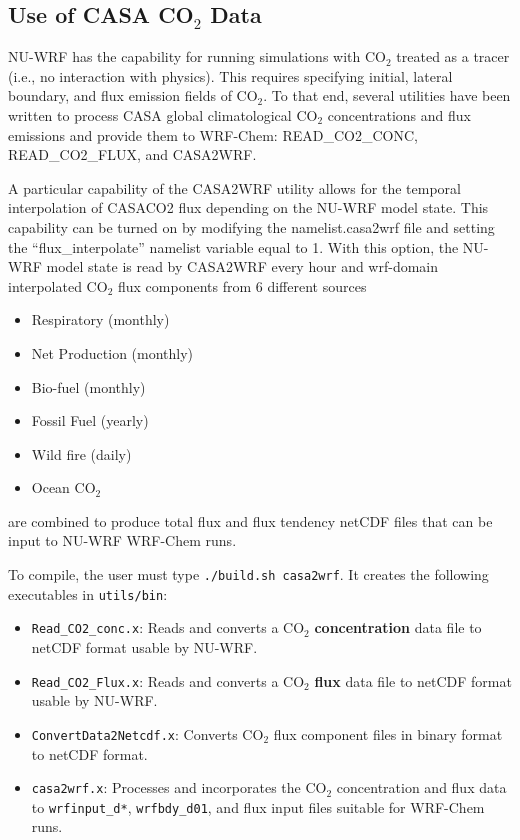 \subsection{Use of CASA CO$_2$ Data}
\label{subsec:CasaWorkflow}

NU-WRF has the capability for running simulations with CO$_2$ treated as
a tracer (i.e., no interaction with physics). This requires specifying initial,
lateral boundary, and flux emission fields of CO$_2$. To that end, several
utilities have been written to process CASA global climatological CO$_2$ 
concentrations and flux emissions and provide them to WRF-Chem: 
READ\_CO2\_CONC, READ\_CO2\_FLUX, and CASA2WRF. 

A particular capability of the CASA2WRF utility allows for the temporal interpolation 
of CASACO2 flux depending on the NU-WRF model state. This capability can
be turned on by modifying the namelist.casa2wrf file and setting  the ``flux\_interpolate'' 
namelist variable equal to 1. With this option, the NU-WRF model state is read by 
CASA2WRF every hour and wrf-domain interpolated CO$_2$ flux components from 6 different sources
\begin{itemize}
\item Respiratory (monthly)
\item Net Production (monthly)
\item Bio-fuel (monthly)
\item Fossil Fuel (yearly)
\item Wild fire (daily) 
\item Ocean CO$_2$
\end{itemize}

are combined to produce total flux and flux tendency netCDF files that can be 
input to NU-WRF WRF-Chem runs. 

To compile, the user must type \texttt{./build.sh casa2wrf}. It creates the 
following executables in \texttt{utils/bin}:

\begin{itemize}

\item \texttt{Read\_CO2\_conc.x}: Reads and converts a CO$_2$ 
  \textbf{concentration} data file to netCDF format usable by NU-WRF.

\item \texttt{Read\_CO2\_Flux.x}: Reads and converts a CO$_2$ 
  \textbf{flux} data file to netCDF format usable by NU-WRF.
  
\item \texttt{ConvertData2Netcdf.x}: Converts CO$_2$ flux 
  component files in binary format to netCDF format.
  
\item \texttt{casa2wrf.x}: Processes and incorporates the CO$_2$ concentration and flux data
  to \texttt{wrfinput\_d*}, \texttt{wrfbdy\_d01}, and flux input files suitable for 
  WRF-Chem runs. 

\end{itemize}

